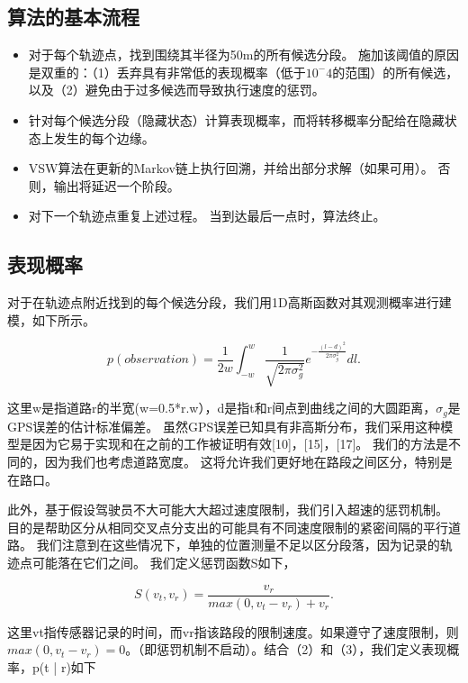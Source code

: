 \subsection{算法的基本流程}
\begin{itemize}
\item 对于每个轨迹点，找到围绕其半径为50m的所有候选分段。 施加该阈值的原因是双重的：（1）丢弃具有非常低的表现概率（低于$10^-4$的范围）的所有候选，以及（2）避免由于过多候选而导致执行速度的惩罚。

\item 针对每个候选分段（隐藏状态）计算表现概率，而将转移概率分配给在隐藏状态上发生的每个边缘。

\item VSW算法在更新的Markov链上执行回溯，并给出部分求解（如果可用）。 否则，输出将延迟一个阶段。

\item 对下一个轨迹点重复上述过程。 当到达最后一点时，算法终止。
\end{itemize}

\subsection{表现概率}
对于在轨迹点附近找到的每个候选分段，我们用1D高斯函数对其观测概率进行建模，如下所示。

\begin{equation*}
p(observation)=\frac{1}{2w}{\int_{-w}^{w}}\frac{1}{\sqrt{2\pi\sigma_{g}^{2}}}e^{-\frac{(l-d)^{2}}{2\pi\sigma_{g}^{2}}}dl.
\end{equation*}

这里w是指道路r的半宽(w=0.5*r.w），d是指t和r间点到曲线之间的大圆距离，$\sigma_{g}$是GPS误差的估计标准偏差。 虽然GPS误差已知具有非高斯分布，我们采用这种模型是因为它易于实现和在之前的工作被证明有效[10]，[15]，[17]。 我们的方法是不同的，因为我们也考虑道路宽度。 这将允许我们更好地在路段之间区分，特别是在路口。

此外，基于假设驾驶员不大可能大大超过速度限制，我们引入超速的惩罚机制。 目的是帮助区分从相同交叉点分支出的可能具有不同速度限制的紧密间隔的平行道路。 我们注意到在这些情况下，单独的位置测量不足以区分段落，因为记录的轨迹点可能落在它们之间。 我们定义惩罚函数S如下，

\begin{equation*}
S(v_{t},v_{r})=\frac{v_{r}}{max(0,v_{t}-v_{r})+v_{r}}.
\end{equation*}

这里vt指传感器记录的时间，而vr指该路段的限制速度。如果遵守了速度限制，则$max(0,v_{t}-v_{r})=0$。（即惩罚机制不启动）。结合（2）和（3），我们定义表现概率，p(t | r)如下

